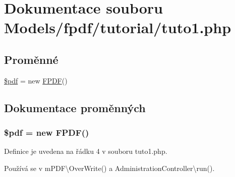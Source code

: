 \hypertarget{tuto1_8php}{\section{Dokumentace souboru Models/fpdf/tutorial/tuto1.php}
\label{tuto1_8php}
}
\subsection*{Proměnné}
\begin{DoxyCompactItemize}
\item 
\hyperlink{tuto1_8php_a964ee5ee597c515cbb4dad2f14054cb4}{\$pdf} = new \hyperlink{class_f_p_d_f}{F\-P\-D\-F}()
\end{DoxyCompactItemize}


\subsection{Dokumentace proměnných}
\hypertarget{tuto1_8php_a964ee5ee597c515cbb4dad2f14054cb4}{
\subsubsection[{\$pdf}]{\setlength{\rightskip}{0pt plus 5cm}\$pdf = new {\bf F\-P\-D\-F}()}}\label{tuto1_8php_a964ee5ee597c515cbb4dad2f14054cb4}


Definice je uvedena na řádku 4 v souboru tuto1.\-php.



Používá se v m\-P\-D\-F\textbackslash{}\-Over\-Write() a Administration\-Controller\textbackslash{}run().

